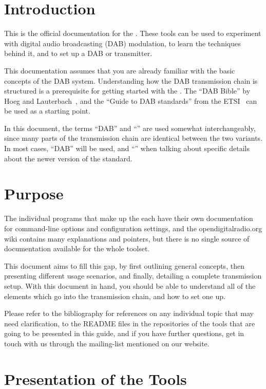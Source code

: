 \section{Introduction}
This is the official documentation for the \mmbtools. These tools can be used to
experiment with digital audio broadcasting (DAB) modulation, to learn the
techniques behind it, and to set up a DAB or \dabplus transmitter.

This documentation assumes that you are already familiar with the basic concepts
of the DAB system. Understanding how the DAB transmission chain is structured is
a prerequisite for getting started with the \mmbtools. The ``DAB Bible'' by Hoeg
and Lauterbach~\cite{hoeg}, and the ``Guide to DAB standards'' from the
ETSI~\cite{etsidabguide} can be used as a starting point.

In this document, the terms ``DAB'' and ``\dabplus'' are used somewhat
interchangeably, since many parts of the transmission chain are identical
between the two variants. In most cases, ``DAB'' will be used, and ``\dabplus''
when talking about specific details about the newer version of the standard.


\section{Purpose}
The individual programs that make up the \mmbtools each have their own
documentation for command-line options and configuration settings, and the
opendigitalradio.org wiki contains many
explanations and pointers, but there is no single source of documentation
available for the whole toolset.

This document aims to fill this gap, by first outlining general concepts, then
presenting different usage scenarios, and finally, detailing a complete
transmission setup.
With this document in hand, you should be able to understand all of the elements
which go into the \mmbtools transmission chain, and how to set one up.

Please refer to the bibliography for references on any individual topic that may need
clarification, to the README files in the repositories of the tools that are
going to be presented in this guide, and if you have further questions, get in
touch with us through the mailing-list mentioned on our website.

\section{Presentation of the Tools}
